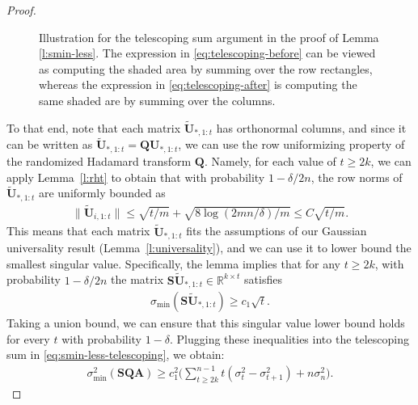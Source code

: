 \documentclass[11pt]{article}
\def\A{{\mathbf A}}
\def\Q{{\mathbf Q}}
\def\S{{\mathbf S}}
\def\R{{\mathbf R}}
\def\U{{\mathbf U}}
\def\R{{\mathds R}}
\begin{document}
\begin{proof}
\begin{figure}
\caption{Illustration for the telescoping sum argument in the proof of Lemma \ref{l:smin-less}. The expression in \eqref{eq:telescoping-before} can be viewed as computing the shaded area by summing over the row rectangles, whereas the expression in \eqref{eq:telescoping-after} is computing the same shaded are by summing over the columns.}
\label{f:telescoping}
\end{figure}


To that end, note that each matrix $\tilde\U_{*,1:t}$ has orthonormal columns, and since it can be written as $\tilde\U_{*,1:t}=\Q\U_{*,1:t}$, we can use the row uniformizing property of the randomized Hadamard transform $\Q$. Namely, for each value of $t \geq 2k$, we can apply Lemma~\ref{l:rht} to obtain that with probability $1 - \delta/2n$, the row norms of $\tilde\U_{*,1:t}$ are uniformly bounded as
\begin{align*}
  \|\tilde\U_{i,1:t}\| \leq \sqrt{t/m} + \sqrt{8 \log(2mn / \delta) / m}
  \leq C \sqrt{t/m}.
\end{align*}
This means that each matrix $\tilde\U_{*,1:t}$ fits the assumptions of our Gaussian universality result (Lemma~\ref{l:universality}), and we can use it to lower bound the smallest singular value. Specifically, the lemma implies that for any $t\geq 2k$, with probability $1 - \delta / 2n$ the matrix $\S\tilde\U_{*,1:t}\in\R^{k\times t}$ satisfies
\begin{align*}
    \sigma_{\min}(\S\tilde\U_{*,1:t}) \geq c_1 \sqrt{t}.
\end{align*}
Taking a union bound, we can ensure that this singular value lower bound holds for every $t$ with probability $1 - \delta$. Plugging these inequalities into the telescoping sum in \eqref{eq:smin-less-telescoping}, we obtain:
\begin{align}
    \sigma_{\min}^2(\S\Q\A)
    \geq c_1^2\bigg(\sum_{t\geq 2k}^{n-1}t(\sigma_t^2-\sigma_{t+1}^2) + n\sigma_n^2\bigg).\label{eq:telescoping-before}
\end{align}


\end{proof}
\end{document}
